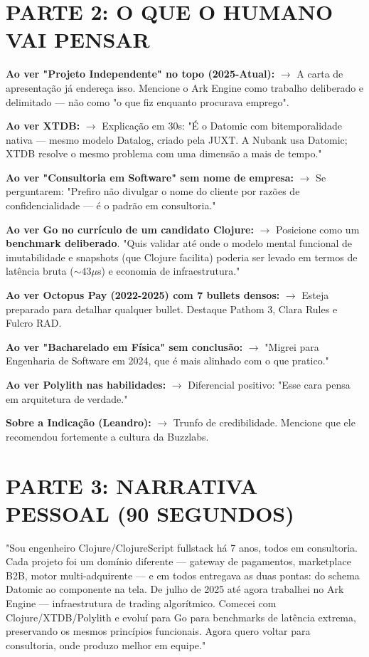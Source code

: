 \documentclass[10pt,a4paper]{article}
\begin{document}
\section*{PARTE 2: O QUE O HUMANO VAI PENSAR}

\textbf{Ao ver "Projeto Independente" no topo (2025-Atual):}
$\to$ A carta de apresentação já endereça isso. Mencione o Ark Engine como trabalho deliberado e delimitado — não como "o que fiz enquanto procurava emprego".

\textbf{Ao ver XTDB:}
$\to$ Explicação em 30s: "É o Datomic com bitemporalidade nativa — mesmo modelo Datalog, criado pela JUXT. A Nubank usa Datomic; XTDB resolve o mesmo problema com uma dimensão a mais de tempo."

\textbf{Ao ver "Consultoria em Software" sem nome de empresa:}
$\to$ Se perguntarem: "Prefiro não divulgar o nome do cliente por razões de confidencialidade — é o padrão em consultoria."

\textbf{Ao ver Go no currículo de um candidato Clojure:}
$\to$ Posicione como um \textbf{benchmark deliberado}. "Quis validar até onde o modelo mental funcional de imutabilidade e snapshots (que Clojure facilita) poderia ser levado em termos de latência bruta ($\sim$43$\mu$s) e economia de infraestrutura."

\textbf{Ao ver Octopus Pay (2022-2025) com 7 bullets densos:}
$\to$ Esteja preparado para detalhar qualquer bullet. Destaque Pathom 3, Clara Rules e Fulcro RAD.

\textbf{Ao ver "Bacharelado em Física" sem conclusão:}
$\to$ "Migrei para Engenharia de Software em 2024, que é mais alinhado com o que pratico."

\textbf{Ao ver Polylith nas habilidades:}
$\to$ Diferencial positivo: "Esse cara pensa em arquitetura de verdade."

\textbf{Sobre a Indicação (Leandro):}
$\to$ Trunfo de credibilidade. Mencione que ele recomendou fortemente a cultura da Buzzlabs.

\section*{PARTE 3: NARRATIVA PESSOAL (90 SEGUNDOS)}
"Sou engenheiro Clojure/ClojureScript fullstack há 7 anos, todos em consultoria. Cada projeto foi um domínio diferente — gateway de pagamentos, marketplace B2B, motor multi-adquirente — e em todos entregava as duas pontas: do schema Datomic ao componente na tela. De julho de 2025 até agora trabalhei no Ark Engine — infraestrutura de trading algorítmico. Comecei com Clojure/XTDB/Polylith e evoluí para Go para benchmarks de latência extrema, preservando os mesmos princípios funcionais. Agora quero voltar para consultoria, onde produzo melhor em equipe."
\end{document}
